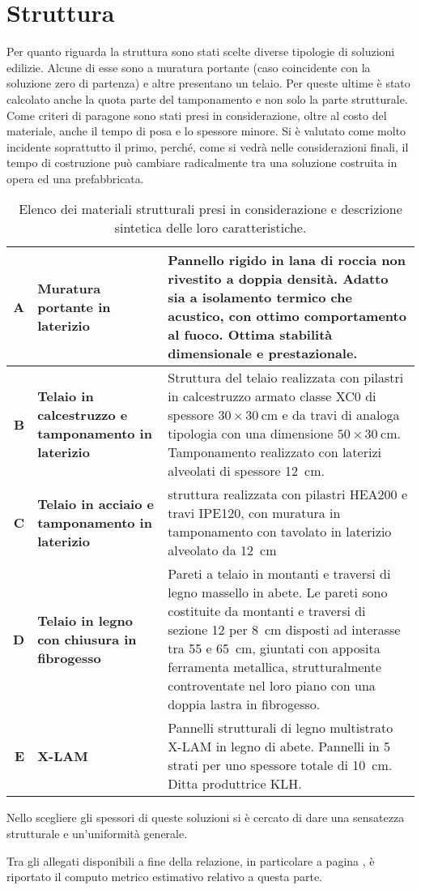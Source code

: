 \section{Struttura}
Per quanto riguarda la struttura sono stati scelte diverse tipologie di soluzioni edilizie. 
Alcune di esse sono a muratura portante (caso coincidente con la soluzione zero di partenza) e altre presentano un telaio. 
Per queste ultime è stato calcolato anche la quota parte del tamponamento e non solo la parte strutturale. 
Come criteri di paragone sono stati presi in considerazione, oltre al costo del materiale, anche il tempo di posa e lo spessore minore. 
Si è valutato come molto incidente soprattutto il primo, perché, come si vedrà nelle considerazioni finali, il tempo di costruzione può cambiare radicalmente tra una soluzione costruita in opera ed una prefabbricata.
\begin{table}[H]
\caption{Elenco dei materiali strutturali presi in considerazione e descrizione sintetica delle loro caratteristiche.}
\centering
\begin{tabularx}{\textwidth}{rXX}
    \toprule
        \textbf{A} & \textbf{Muratura portante in laterizio} & Pannello rigido in lana di roccia non rivestito a doppia densità. 
        Adatto sia a isolamento termico che acustico, con ottimo comportamento al fuoco. 
        Ottima stabilità dimensionale e prestazionale. \\\midrule
        \textbf{B} & \textbf{Telaio in calcestruzzo e tamponamento in laterizio} & Struttura del telaio realizzata con pilastri in calcestruzzo armato classe XC0 di spessore $30\times\SI{30}{\centi\meter}$ e da travi di analoga tipologia con una dimensione $50\times\SI{30}{\centi\meter}$. Tamponamento realizzato con laterizi alveolati di spessore \SI{12}{\centi\meter}. \\\midrule
        \textbf{C} & \textbf{Telaio in acciaio e tamponamento in laterizio} & struttura realizzata con pilastri HEA200 e travi IPE120, con muratura in tamponamento con tavolato in laterizio alveolato da \SI{12}{\centi\meter}\\\midrule
        \textbf{D} & \textbf{Telaio in legno con chiusura in fibrogesso} & Pareti a telaio in montanti e traversi di legno massello in abete. Le pareti sono costituite da montanti e traversi di sezione 12 per \SI{8}{\centi\meter} disposti ad interasse tra 55 e \SI{65}{\centi\meter}, giuntati con apposita ferramenta metallica, strutturalmente controventate nel loro piano con una doppia lastra in fibrogesso. \\\midrule
        \textbf{E} & \textbf{X-LAM} & Pannelli strutturali di legno multistrato X-LAM in legno di abete. Pannelli in 5 strati per uno spessore totale di \SI{10}{\centi\meter}. Ditta produttrice KLH.\\
    \bottomrule
\end{tabularx}
\end{table}
Nello scegliere gli spessori di queste soluzioni si è cercato di dare una sensatezza strutturale e un'uniformità generale.

Tra gli allegati disponibili a fine della relazione, in particolare a pagina \pageref{STRUTcostoMateriale}, è riportato il computo metrico estimativo relativo a questa parte.




